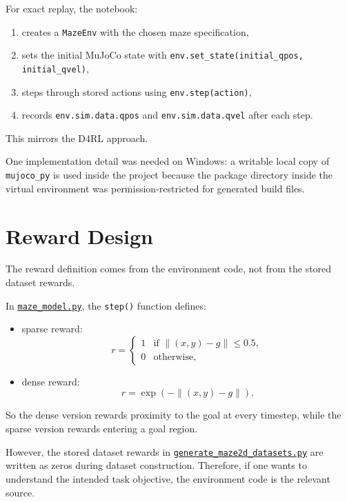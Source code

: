 \documentclass[12pt]{article}
\begin{document}
For exact replay, the notebook:

\begin{enumerate}[leftmargin=*]
\item creates a \texttt{MazeEnv} with the chosen maze specification,
\item sets the initial MuJoCo state with \texttt{env.set\_state(initial\_qpos, initial\_qvel)},
\item steps through stored actions using \texttt{env.step(action)},
\item records \texttt{env.sim.data.qpos} and \texttt{env.sim.data.qvel} after each step.
\end{enumerate}

This mirrors the D4RL approach.

One implementation detail was needed on Windows: a writable local copy of \texttt{mujoco\_py} is used inside the project because the package directory inside the virtual environment was permission-restricted for generated build files.

\section*{Reward Design}

The reward definition comes from the environment code, not from the stored dataset rewards.

In \href{./d4rl/d4rl/pointmaze/maze_model.py}{\texttt{maze\_model.py}}, the \texttt{step()} function defines:

\begin{itemize}[leftmargin=*]
\item sparse reward:
\[
r =
\begin{cases}
1 & \text{if } \lVert (x,y)-g \rVert \le 0.5,\\
0 & \text{otherwise,}
\end{cases}
\]
\item dense reward:
\[
r = \exp(-\lVert (x,y)-g \rVert).
\]
\end{itemize}

So the dense version rewards proximity to the goal at every timestep, while the sparse version rewards entering a goal region.

However, the stored dataset rewards in
\href{./d4rl/scripts/generation/generate_maze2d_datasets.py}{\texttt{generate\_maze2d\_datasets.py}}
are written as zeros during dataset construction. Therefore, if one wants to understand the intended task objective, the environment code is the relevant source.
\end{document}
